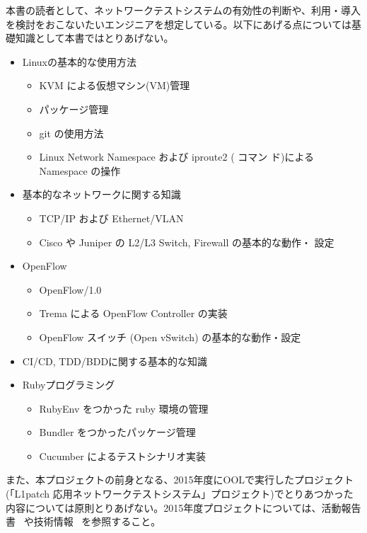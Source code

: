 本書の読者として、ネットワークテストシステムの有効性の判断や、利用・導入
を検討をおこないたいエンジニアを想定している。以下にあげる点については基
礎知識として本書ではとりあげない。

\begin{itemize}
 \item Linuxの基本的な使用方法
       \begin{itemize}
        \item KVM による仮想マシン(VM)管理
        \item パッケージ管理
        \item git の使用方法
        \item Linux Network Namespace および iproute2 (  コマン
              ド)によるNamespace の操作
       \end{itemize}
 \item 基本的なネットワークに関する知識
       \begin{itemize}
        \item TCP/IP および Ethernet/VLAN
        \item Cisco や Juniper の L2/L3 Switch, Firewall の基本的な動作・
              設定
       \end{itemize}
 \item OpenFlow
       \begin{itemize}
        \item OpenFlow/1.0
        \item Trema による OpenFlow Controller の実装
        \item OpenFlow スイッチ (Open vSwitch) の基本的な動作・設定
       \end{itemize}
 \item CI/CD, TDD/BDDに関する基本的な知識
 \item Rubyプログラミング
       \begin{itemize}
        \item RubyEnv をつかった ruby 環境の管理
        \item Bundler をつかったパッケージ管理
        \item Cucumber によるテストシナリオ実装
       \end{itemize}
\end{itemize}

また、本プロジェクトの前身となる、2015年度にOOLで実行したプロジェクト
(「L1patch 応用ネットワークテストシステム」プロジェクト)でとりあつかった
内容については原則とりあげない。2015年度プロジェクトについては、活動報告
書~\cite{l1pjpoc} や技術情報~\cite{l1pjtech} を参照すること。

